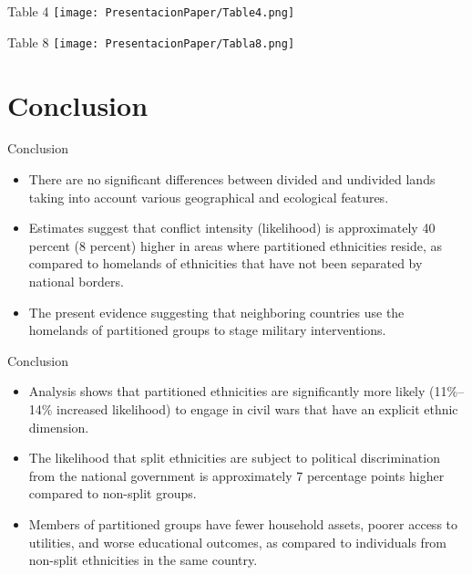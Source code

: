 \documentclass[11pt]{beamer}
\begin{document}
\begin{frame}{Table 4}
\texttt{[image: PresentacionPaper/Table4.png]} 
\centering
\end{frame}

\begin{frame}{Table 8}
\texttt{[image: PresentacionPaper/Tabla8.png]} 
\centering
\end{frame}

\section{Conclusion}	
\begin{frame}{Conclusion}
\justifying 
\begin{itemize}
\item There are no significant differences between divided and undivided lands taking into account various geographical and ecological features.
\pause
\item Estimates suggest that conflict intensity (likelihood) is approximately 40 percent (8 percent) higher in areas where partitioned ethnicities reside, as compared to homelands of ethnicities that have not been separated by national borders. 
\pause
\item The present evidence suggesting that neighboring countries use the homelands of partitioned groups to stage military interventions.

\end{itemize}
\end{frame}

\begin{frame}{Conclusion}
\justifying 
\begin{itemize}
\item Analysis shows that partitioned ethnicities are significantly more likely (11\%–14\% increased likelihood) to engage in civil wars that have an explicit ethnic dimension.
\pause
\item The likelihood that split ethnicities are subject to political discrimination from the national government is approximately 7 percentage points higher compared to non-split groups.
\pause
\item Members of partitioned groups have fewer household assets, poorer access to utilities, and worse
educational outcomes, as compared to individuals from non-split ethnicities in the same country.

\end{itemize}
\end{frame}
\end{document}
